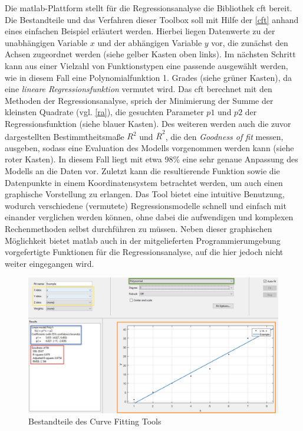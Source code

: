 Die \gls{matlab}-Plattform stellt für die Regressionsanalyse die Bibliothek \gls{cft} bereit. Die Bestandteile und das Verfahren dieser Toolbox soll mit Hilfe der \vref{cft} anhand eines einfachen Beispiel erläutert werden. Hierbei liegen Datenwerte zu der unabhängigen Variable $x$ und der abhängigen Variable $y$ vor, die zunächst den Achsen zugeordnet werden (siehe gelber Kasten oben links). Im nächsten Schritt kann aus einer Vielzahl von Funktionstypen eine passende ausgewählt werden, wie in diesem Fall eine Polynomialfunktion 1. Grades (siehe grüner Kasten), da eine \textit{lineare Regressionsfunktion} vermutet wird. Das \gls{cft} berechnet mit den Methoden der Regressionsanalyse, sprich der Minimierung der Summe der kleinsten Quadrate (vgl. \vref{ra}), die gesuchten Parameter $p1$ und $p2$ der Regressionsfunktion (siehe blauer Kasten). Des weiteren werden auch die zuvor dargestellten Bestimmtheitsmaße $R^2$ und $\overline{R}^2$, die den \textit{Goodness of fit} messen, ausgeben, sodass eine Evaluation des Modells vorgenommen werden kann (siehe roter Kasten). In diesem Fall liegt mit etwa 98\% eine sehr genaue Anpassung des Modells an die Daten vor. Zuletzt kann die resultierende Funktion sowie die Datenpunkte in einem Koordinatensystem betrachtet werden, um auch einen graphische Vorstellung zu erlangen. Das Tool bietet eine intuitive Benutzung, wodurch verschiedene (vermutete) Regressionsmodelle schnell und einfach mit einander verglichen werden können, ohne dabei die aufwendigen und komplexen Rechenmethoden selbst durchführen zu müssen. Neben dieser graphischen Möglichkeit bietet \gls{matlab} auch in der mitgelieferten Programmierumgebung vorgefertigte Funktionen für die Regressionsanalyse, auf die hier jedoch nicht weiter eingegangen wird.

\begin{figure}
\centering
\includegraphics[scale=0.675]{se-wa-jpg/cft}
\caption[Bestandteile des Curve Fitting Tools]{Bestandteile des Curve Fitting Tools\protect\footnotemark}
\label{cft}
\end{figure}
